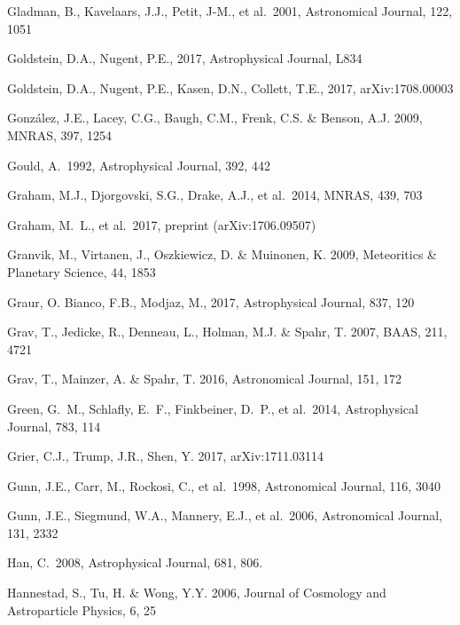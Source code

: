 \documentclass[twocolumn]{aastex61}
\begin{document}
\begin{thebibliography}{}
 Gladman, B., Kavelaars, J.J., Petit, J-M., et al.~2001, Astronomical Journal, 122, 1051

 Goldstein, D.A., Nugent, P.E., 2017, Astrophysical Journal, L834

 Goldstein, D.A., Nugent, P.E., Kasen, D.N., Collett, T.E., 2017, arXiv:1708.00003

 Gonz\'{a}lez, J.E., Lacey, C.G., Baugh, C.M., Frenk, C.S. \& Benson, A.J. 2009, MNRAS, 397, 1254

 Gould, A.\ 1992, Astrophysical Journal, 392, 442

 Graham, M.J., Djorgovski, S.G., Drake, A.J., et al.~2014, MNRAS, 439, 703

 Graham, M.~L., et al.~2017, preprint (arXiv:1706.09507)

 Granvik, M., Virtanen, J., Oszkiewicz, D. \& Muinonen, K. 2009, Meteoritics \& Planetary Science, 44, 1853

 Graur, O. Bianco, F.B., Modjaz, M., 2017, Astrophysical Journal, 837, 120

 Grav, T., Jedicke, R., Denneau, L., Holman, M.J.  \& Spahr, T. 2007, BAAS, 211, 4721

 Grav, T., Mainzer, A. \& Spahr, T. 2016, Astronomical Journal, 151, 172

 Green, G.~M., Schlafly, E.~F., Finkbeiner, D.~P., et al.~2014, Astrophysical Journal, 783, 114

 Grier, C.J., Trump, J.R., Shen, Y. 2017, arXiv:1711.03114

 Gunn, J.E., Carr, M., Rockosi, C., et al.~1998, Astronomical Journal, 116, 3040

 Gunn, J.E., Siegmund, W.A., Mannery, E.J., et al.~2006, Astronomical Journal, 131, 2332

 Han, C.~2008, Astrophysical Journal, 681, 806.

 Hannestad, S., Tu, H. \& Wong, Y.Y. 2006, Journal of Cosmology and Astroparticle Physics, 6, 25


\end{thebibliography}
\end{document}
